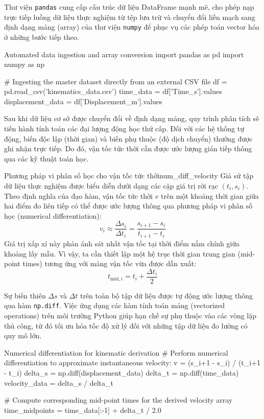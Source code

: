 Thư viện \texttt{pandas} cung cấp cấu trúc dữ liệu DataFrame mạnh mẽ, cho phép nạp trực tiếp luồng dữ liệu thực nghiệm từ tệp lưu trữ và chuyển đổi liền mạch sang định dạng mảng (array) của thư viện \texttt{numpy} để phục vụ các phép toán vector hóa ở những bước tiếp theo.

\begin{pycode}{Automated data ingestion and array conversion}
import pandas as pd
import numpy as np

# Ingesting the master dataset directly from an external CSV file
df = pd.read_csv('kinematics_data.csv')
time_data = df['Time_s'].values
displacement_data = df['Displacement_m'].values
\end{pycode}

Sau khi dữ liệu cơ sở được chuyển đổi về định dạng mảng, quy trình phân tích sẽ tiến hành tính toán các đại lượng động học thứ cấp. Đối với các hệ thống tự động, biến độc lập (thời gian) và biến phụ thuộc (độ dịch chuyển) thường được ghi nhận trực tiếp. Do đó, vận tốc tức thời cần được ước lượng gián tiếp thông qua các kỹ thuật toán học.

\begin{derivation}{Phương pháp vi phân số học cho vận tốc tức thời}{num_diff_velocity}
Giả sử tập dữ liệu thực nghiệm được biểu diễn dưới dạng các cặp giá trị rời rạc $(t_i, s_i)$. Theo định nghĩa của đạo hàm, vận tốc tức thời $v$ trên một khoảng thời gian giữa hai điểm đo liên tiếp có thể được ước lượng thông qua phương pháp vi phân số học (numerical differentiation):
\begin{equation}
    v_i \approx \frac{\Delta s_i}{\Delta t_i} = \frac{s_{i+1} - s_i}{t_{i+1} - t_i}
\end{equation}
Giá trị xấp xỉ này phản ánh sát nhất vận tốc tại thời điểm nằm chính giữa khoảng lấy mẫu. Vì vậy, ta cần thiết lập một hệ trục thời gian trung gian (mid-point times) tương ứng với mảng vận tốc vừa được dẫn xuất:
\begin{equation}
    t_{\text{mid}, i} = t_i + \frac{\Delta t_i}{2}
\end{equation}
\end{derivation}

Sự biến thiên $\Delta s$ và $\Delta t$ trên toàn bộ tập dữ liệu được tự động ước lượng thông qua hàm \texttt{np.diff}. Việc ứng dụng các hàm tính toán mảng (vectorized operations) trên môi trường Python giúp hạn chế sự phụ thuộc vào các vòng lặp thủ công, từ đó tối ưu hóa tốc độ xử lý đối với những tập dữ liệu đo lường có quy mô lớn.

\begin{pycode}{Numerical differentiation for kinematic derivation}
# Perform numerical differentiation to approximate instantaneous velocity: v = (s_i+1 - s_i) / (t_i+1 - t_i)
delta_s = np.diff(displacement_data)
delta_t = np.diff(time_data)
velocity_data = delta_s / delta_t

# Compute corresponding mid-point times for the derived velocity array
time_midpoints = time_data[:-1] + delta_t / 2.0
\end{pycode}